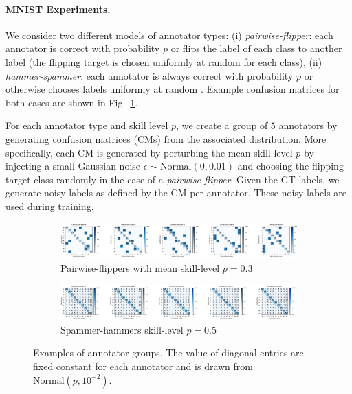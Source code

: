 \paragraph{MNIST Experiments.} We consider two different models of annotator types: (i) \textit{pairwise-flipper}: each annotator is correct with probability $p$ or flips the label of each class to another label (the flipping target is chosen uniformly at random for each class), (ii) \textit{hammer-spammer}: each annotator is always correct with probability $p$ or otherwise chooses labels uniformly at random \cite{khetan2017learning}. Example confusion matrices for both cases are shown in Fig.~\ref{fig:annotator_groups}.

For each annotator type and skill level $p$, we create a group of $5$ annotators by generating confusion matrices (CMs) from the associated distribution. More specifically, each CM is generated by perturbing the mean skill level $p$ by injecting a small Gaussian noise $\epsilon \sim \text{Normal}(0, 0.01)$ and choosing the flipping target class randomly in the case of a \textit{pairwise-flipper}. Given the GT labels, we generate noisy labels as defined by the CM per annotator. These noisy labels are used during training.

\begin{figure}[ht!]
	\center
	\begin{subfigure}[]{1.0\linewidth}
		\caption{Pairwise-flippers with mean skill-level $p=0.3$}
		\includegraphics[width=\linewidth]{chapter_4/figures/pairwise_flipper_example.png}
	\end{subfigure}
	\begin{subfigure}[]{1.0\linewidth}
		\caption{Spammer-hammers skill-level $p=0.5$}
		\includegraphics[width=\linewidth]{chapter_4/figures/hammer_spammer_example.png}
	\end{subfigure}
 	\caption{Examples of annotator groups. The value of diagonal entries are fixed constant for each annotator and is drawn from $\text{Normal}(p, 10^{-2})$.}
	\label{fig:annotator_groups}
	
\end{figure}

